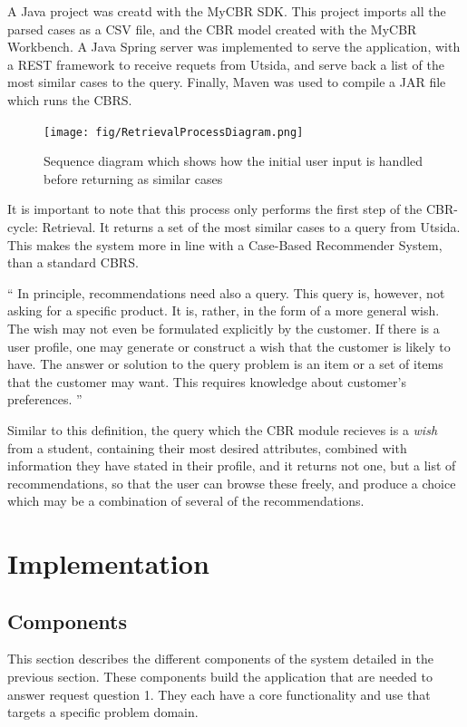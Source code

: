 A Java project was creatd with the MyCBR SDK. This project imports all the parsed cases as a CSV file, and the CBR model created with the MyCBR Workbench. A Java Spring server was implemented to serve the application, with a REST framework to receive requets from Utsida, and serve back a list of the most similar cases to the query. Finally, Maven was used to compile a JAR file which runs the CBRS. 

\begin{figure}[H]
    \label{fig:retrieval_process_diagram}
    \centering
    \texttt{[image: fig/RetrievalProcessDiagram.png]}
    \caption{Sequence diagram which shows how the initial user input is handled before returning as similar cases}
\end{figure}

It is important to note that this process only performs the first step of the CBR-cycle: Retrieval. It returns a set of the most similar cases to a query from Utsida. This makes the system more in line with a Case-Based Recommender System, than a standard CBRS. 

\begin{displayquote}\enquote{
In principle, recommendations need also a query. This query is, however, not asking
for a specific product. It is, rather, in the form of a more general wish. The wish may
not even be formulated explicitly by the customer. If there is a user profile, one may
generate or construct a wish that the customer is likely to have.
The answer or solution to the query problem is an item or a set of items that the
customer may want. This requires knowledge about customer’s preferences.\cite{richter2013case}
}\end{displayquote}

Similar to this definition, the query which the CBR module recieves is a \emph{wish} from a student, containing their most desired attributes, combined with information they have stated in their profile, and it returns not one, but a list of recommendations, so that the user can browse these freely, and produce a choice which may be a combination of several of the recommendations.

\section{Implementation}


\subsection{Components}
This section describes the different components of the system detailed in the previous section. These components build the application that are needed to answer request question 1. They each have a core functionality and use that targets a specific problem domain. 

